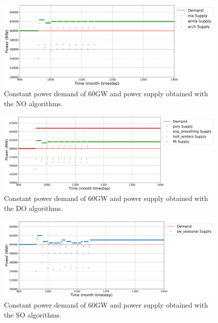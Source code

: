 \documentclass[11pt]{article}
\begin{document}
\begin{figure}[H]
	\centering
	\includegraphics[width=\textwidth]{23-figures/23-power0-buffer01.png} 
	\hfill
	\caption{Constant power demand of 60GW and power supply obtained with the NO algorithms.}
	\label{fig:23-NO}
\end{figure}

\begin{figure}[H]
	\centering
	\includegraphics[width=\textwidth]{23-figures/23-power0-buffer02.png} 
	\hfill
	\caption{Constant power demand of 60GW and power supply obtained with the DO algorithms.}
	\label{fig:23-DO}
\end{figure}

\begin{figure}[H]
	\centering
	\includegraphics[width=\textwidth]{23-figures/23-power0-buffer03.png} 
	\hfill
	\caption{Constant power demand of 60GW and power supply obtained with the SO algorithms.}
	\label{fig:23-SO}
\end{figure}
\end{document}
